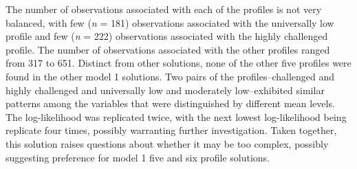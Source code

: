 \documentclass[]{msu-thesis}
\theoremstyle{definition}
\theoremstyle{definition}
\theoremstyle{definition}
\theoremstyle{remark}
\begin{document}
The number of observations associated with each of the profiles is not
very balanced, with few (\emph{n} = 181) observations associated with
the universally low profile and few (\emph{n} = 222) observations
associated with the highly challenged profile. The number of
observations associated with the other profiles ranged from 317 to 651.
Distinct from other solutions, none of the other five profiles were
found in the other model 1 solutions. Two pairs of the
profiles--challenged and highly challenged and universally low and
moderately low--exhibited similar patterns among the variables that were
distinguished by different mean levels. The log-likelihood was
replicated twice, with the next lowest log-likelihood being replicate
four times, possibly warranting further investigation. Taken together,
this solution raises questions about whether it may be too complex,
possibly suggesting preference for model 1 five and six profile
solutions.


\end{document}

